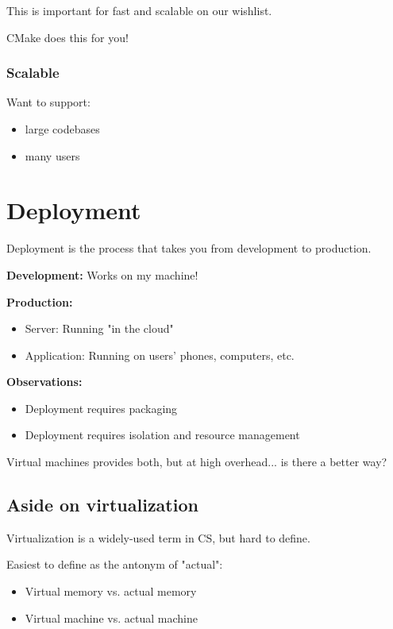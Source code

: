 \documentclass{article}
\begin{document}
This is important for fast and scalable on our wishlist. 

CMake does this for you!

\subsubsection{Scalable}

Want to support:
\begin{itemize}
    \item large codebases
    \item many users  
\end{itemize}

\pagebreak

\section{Deployment}

Deployment is the process that takes you from development to production. 

\vspace*{1em}

\textbf{Development: } Works on my machine!

\vspace*{1em}

\textbf{Production: }
\begin{itemize}
    \item Server: Running "in the cloud"
    \item Application: Running on users' phones, computers, etc.
\end{itemize}

\textbf{Observations: }
\begin{itemize}
    \item Deployment requires packaging
    \item Deployment requires isolation and resource management 
\end{itemize}

Virtual machines provides both, but at high overhead... is there a better way?

\subsection{Aside on virtualization}

Virtualization is a widely-used term in CS, but hard to define.

Easiest to define as the antonym of "actual":
\begin{itemize}
    \item Virtual memory vs. actual memory
    \item Virtual machine vs. actual machine
\end{itemize}
\end{document}
